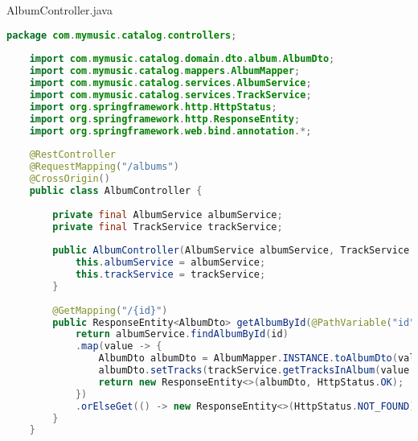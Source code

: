 AlbumController.java
\begin{lstlisting}[language=java]
	package com.mymusic.catalog.controllers;
	
	import com.mymusic.catalog.domain.dto.album.AlbumDto;
	import com.mymusic.catalog.mappers.AlbumMapper;
	import com.mymusic.catalog.services.AlbumService;
	import com.mymusic.catalog.services.TrackService;
	import org.springframework.http.HttpStatus;
	import org.springframework.http.ResponseEntity;
	import org.springframework.web.bind.annotation.*;
	
	@RestController
	@RequestMapping("/albums")
	@CrossOrigin()
	public class AlbumController {
		
		private final AlbumService albumService;
		private final TrackService trackService;
		
		public AlbumController(AlbumService albumService, TrackService trackService) {
			this.albumService = albumService;
			this.trackService = trackService;
		}
		
		@GetMapping("/{id}")
		public ResponseEntity<AlbumDto> getAlbumById(@PathVariable("id") Long id) {
			return albumService.findAlbumById(id)
			.map(value -> {
				AlbumDto albumDto = AlbumMapper.INSTANCE.toAlbumDto(value);
				albumDto.setTracks(trackService.getTracksInAlbum(value.getId()));
				return new ResponseEntity<>(albumDto, HttpStatus.OK);
			})
			.orElseGet(() -> new ResponseEntity<>(HttpStatus.NOT_FOUND));
		}
	}	
\end{lstlisting}

